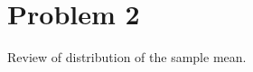 \documentclass[12pt,letterpaper]{article}
\begin{document}
\begin{enumerate}[(a)]
{%
}
\fi
\end{enumerate}


\section*{Problem 2}
Review of distribution of the sample mean.
\end{document}
